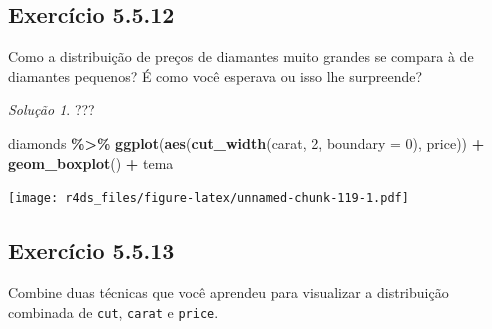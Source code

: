\documentclass[
]{latex/krantz}
\newenvironment{Shaded}{\begin{snugshade}}{\end{snugshade}}
\newcommand{\AttributeTok}[1]{\textcolor[rgb]{0.13,0.29,0.53}{#1}}
\newcommand{\DecValTok}[1]{\textcolor[rgb]{0.00,0.00,0.81}{#1}}
\newcommand{\FunctionTok}[1]{\textcolor[rgb]{0.13,0.29,0.53}{\textbf{#1}}}
\newcommand{\NormalTok}[1]{#1}
\newcommand{\SpecialCharTok}[1]{\textcolor[rgb]{0.81,0.36,0.00}{\textbf{#1}}}
\theoremstyle{definition}
\theoremstyle{definition}
\theoremstyle{definition}
\theoremstyle{definition}
\theoremstyle{remark}
\newtheorem*{solution}{Solução}
\begin{document}
\hypertarget{exr5-5-12}{%
\subsection*{Exercício 5.5.12}\label{exr5-5-12}}

Como a distribuição de preços de diamantes muito grandes se compara à de diamantes pequenos? É como você esperava ou isso lhe surpreende?

\begin{solution}
???

\begin{Shaded}
\begin{Highlighting}[]
\NormalTok{diamonds }\SpecialCharTok{\%\textgreater{}\%}
    \FunctionTok{ggplot}\NormalTok{(}\FunctionTok{aes}\NormalTok{(}\FunctionTok{cut\_width}\NormalTok{(carat, }\DecValTok{2}\NormalTok{, }\AttributeTok{boundary =} \DecValTok{0}\NormalTok{), price)) }\SpecialCharTok{+}
        \FunctionTok{geom\_boxplot}\NormalTok{() }\SpecialCharTok{+}
\NormalTok{        tema}
\end{Highlighting}
\end{Shaded}

\texttt{[image: r4ds\_files/figure-latex/unnamed-chunk-119-1.pdf]}
\end{solution}

\hypertarget{exr5-5-13}{%
\subsection*{Exercício 5.5.13}\label{exr5-5-13}}

Combine duas técnicas que você aprendeu para visualizar a distribuição combinada de \texttt{cut}, \texttt{carat} e \texttt{price}.
\end{document}
